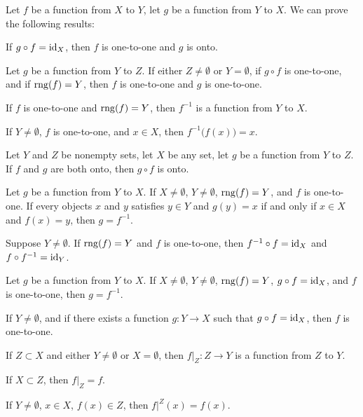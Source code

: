 \documentclass{article}
\begin{document}
Let $f$ be a function from $X$ to $Y$, let $g$ be a function from $Y$ to $X$.
We can prove the following results:
\begin{thm}
\item\label{funct2:23} %
  If $g\circ f=\operatorname{id}_{X}$, then $f$ is one-to-one and $g$ is onto.
\item\label{funct2:24} %
  Let $g$ be a function from $Y$ to $Z$.
  If either $Z\neq\emptyset$ or $Y=\emptyset$,
  if $g\circ f$ is one-to-one,
  and if $\operatorname{rng}(f)=Y$, then $f$ is one-to-one and $g$ is one-to-one.
\item\label{funct2:25} %
  If $f$ is one-to-one and $\operatorname{rng}(f)=Y$, then $f^{-1}$ is a function from
  $Y$ to $X$.
\item\label{funct2:26} %
  If $Y\neq\emptyset$, $f$ is one-to-one, and $x\in X$,
  then $f^{-1}\bigl(f(x)\bigr)=x$.
\item\label{funct2:27} Let $Y$ and $Z$ be nonempty sets, let $X$ be any
  set, %
  let $g$ be a function from $Y$ to $Z$.
  If $f$ and $g$ are both onto, then $g\circ f$ is onto.
\item\label{funct2:28} %
  Let $g$ be a function from $Y$ to $X$.
  If $X\neq\emptyset$, $Y\neq\emptyset$,
  $\operatorname{rng}(f)=Y$, and $f$ is one-to-one. If every objects $x$ and $y$ satisfies $y\in Y$ and $g(y)=x$ if and
  only if $x\in X$ and $f(x)=y$, then $g=f^{-1}$.
\item\label{funct2:29} %
  Suppose $Y\neq\emptyset$. If $\operatorname{rng}(f)=Y$ and $f$ is one-to-one,
  then $f^{-1}\circ f=\operatorname{id}_{X}$ and $f\circ f^{-1}=\operatorname{id}_{Y}$.
\item\label{funct2:30} Let $g$ be a function from $Y$ to $X$.
  If $X\neq\emptyset$, $Y\neq\emptyset$, $\operatorname{rng}(f)=Y$, $g\circ f=\operatorname{id}_{X}$,
  and $f$ is one-to-one, then $g=f^{-1}$.
\item\label{funct2:31} If $Y\neq\emptyset$, and if there exists a function
  $g\colon Y\to X$ such that $g\circ f=\operatorname{id}_{X}$, then $f$ is one-to-one.
\item\label{funct2:32} If $Z\subset X$ and either $Y\neq\emptyset$ or
  $X=\emptyset$, then $f|_{Z}\colon Z\to Y$ is a function from $Z$ to $Y$.
\item\label{funct2:33} If $X\subset Z$, then $f|_{Z}=f$.
\item\label{funct2:34} If $Y\neq\emptyset$, $x\in X$, $f(x)\in Z$, then $f|^{Z}(x)=f(x)$.

\end{thm}
\end{document}

